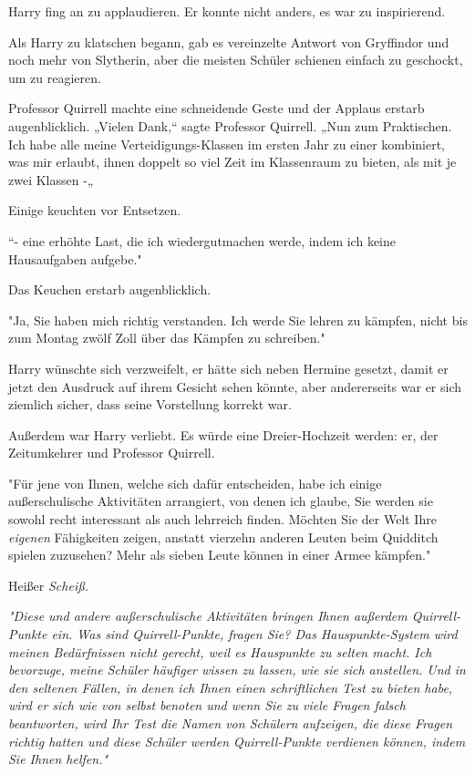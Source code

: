 {Harry fing an zu applaudieren. Er konnte nicht anders, es war zu inspirierend.

Als Harry zu klatschen begann, gab es vereinzelte Antwort von Gryffindor und noch mehr von Slytherin, aber die meisten Schüler schienen einfach zu geschockt, um zu reagieren.

Professor Quirrell machte eine schneidende Geste und der Applaus erstarb augenblicklich. „Vielen Dank,“ sagte Professor Quirrell. „Nun zum Praktischen. Ich habe alle meine Verteidigungs-Klassen im ersten Jahr zu einer kombiniert, was mir erlaubt, ihnen doppelt so viel Zeit im Klassenraum zu bieten, als mit je zwei Klassen -„

Einige keuchten vor Entsetzen.

“- eine erhöhte Last, die ich wiedergutmachen werde, indem ich keine Hausaufgaben aufgebe."

Das Keuchen erstarb augenblicklich.

"Ja, Sie haben mich richtig verstanden. Ich werde Sie lehren zu kämpfen, nicht bis zum Montag zwölf Zoll über das Kämpfen zu schreiben."

Harry wünschte sich verzweifelt, er hätte sich neben Hermine gesetzt, damit er jetzt den Ausdruck auf ihrem Gesicht sehen könnte, aber andererseits war er sich ziemlich sicher, dass seine Vorstellung korrekt war.

Außerdem war Harry verliebt. Es würde eine Dreier-Hochzeit werden: er, der Zeitumkehrer und Professor Quirrell.

"Für jene von Ihnen, welche sich dafür entscheiden, habe ich einige außerschulische Aktivitäten arrangiert, von denen ich glaube, Sie werden sie sowohl recht interessant als auch lehrreich finden. Möchten Sie der Welt Ihre \emph{eigenen} Fähigkeiten zeigen, anstatt vierzehn anderen Leuten beim Quidditch spielen zuzusehen? Mehr als sieben Leute können in einer Armee kämpfen."

Heißer \emph{Scheiß.}

\emph{"Diese und andere außerschulische Aktivitäten bringen Ihnen außerdem Quirrell-Punkte ein. Was sind Quirrell-Punkte, fragen Sie? Das Hauspunkte-System wird meinen Bedürfnissen nicht gerecht, weil es Hauspunkte zu selten macht. Ich bevorzuge, meine Schüler häufiger wissen zu lassen, wie sie sich anstellen. Und in den seltenen Fällen, in denen ich Ihnen einen schriftlichen Test zu bieten habe, wird er sich wie von selbst benoten und wenn Sie zu viele Fragen falsch beantworten, wird Ihr Test die Namen von Schülern aufzeigen, die diese Fragen richtig hatten und diese Schüler werden Quirrell-Punkte verdienen können, indem Sie Ihnen helfen."}

}

